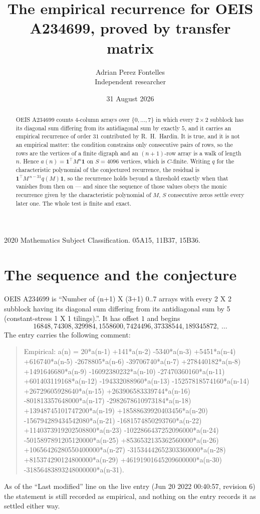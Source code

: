 \documentclass[11pt,a4paper]{article}
\title{The empirical recurrence for OEIS A234699, proved by transfer matrix}
\author{Adrian Perez Fontelles\\ \small Independent researcher}
\date{31 August 2026}
\theoremstyle{plain}
\theoremstyle{definition}
\begin{document}
\maketitle

\begin{abstract}
OEIS A234699 counts $4$-column arrays over $\{0,\dots,7\}$ in which every
$2\times2$ subblock has its diagonal sum differing from its antidiagonal sum by
exactly $5$, and it
carries an empirical recurrence of order $31$ contributed by R.~H.~Hardin. It is true,
and it is not an empirical matter: the condition constrains only consecutive pairs of rows,
so the rows are the vertices of a finite digraph and an $(n+1)$-row array is a walk of
length $n$. Hence $a(n)=\mathbf{1}^{\!\top}M^{n}\mathbf{1}$ on $S=4096$ vertices, which
is $C$-finite. Writing $q$ for the characteristic polynomial of the conjectured recurrence,
the residual is $\mathbf{1}^{\!\top}M^{\,n-31}q(M)\mathbf{1}$, so the recurrence
holds beyond a threshold exactly when that vanishes from then on --- and since the sequence
of those values obeys the monic recurrence given by the characteristic polynomial of $M$,
$S$ consecutive zeros settle every later one. The whole test is finite and exact.
\end{abstract}

\noindent\small 2020 Mathematics Subject Classification. 05A15, 11B37, 15B36.\normalsize

\section{The sequence and the conjecture}

OEIS A234699 is ``Number of (n+1) X (3+1) 0..7 arrays with every 2 X 2 subblock having its diagonal sum differing from its antidiagonal sum by 5 (constant-stress 1 X 1 tilings).''. It has offset
$1$ and begins
\[
16848, 74308, 329984, 1558600, 7424496, 37338544, 189345872,\ \dots
\]
The entry carries the following comment:
\begin{quote}\small
Empirical: a(n) = 20*a(n-1) +141*a(n-2) -5340*a(n-3) +5451*a(n-4) +616740*a(n-5) -2678805*a(n-6) -39706740*a(n-7) +278440182*a(n-8) +1491646680*a(n-9) -16092380232*a(n-10) -27470360160*a(n-11) +601403119168*a(n-12) -194332088960*a(n-13) -15257818574160*a(n-14) +26729605928640*a(n-15) +263906583339744*a(n-16) -801813357648000*a(n-17) -2982678610973184*a(n-18) +13948745101747200*a(n-19) +18588639920403456*a(n-20) -156794289434542080*a(n-21) -1681574850293760*a(n-22) +1140373919202508800*a(n-23) -1022866437252096000*a(n-24) -5015897891205120000*a(n-25) +8536532135362560000*a(n-26) +10656426280550400000*a(n-27) -31534442652303360000*a(n-28) +815374290124800000*a(n-29) +46191901645209600000*a(n-30) -31856483893248000000*a(n-31).
\end{quote}
As of the ``Last modified'' line on the live entry (Jun 20 2022 00:40:57, revision 6) the statement is
still recorded as empirical, and nothing on the entry records it as settled either way.
\end{document}
